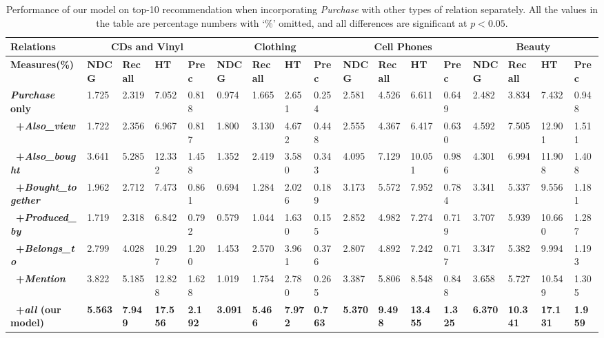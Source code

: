 \documentclass[algorithms,article,accept,moreauthors,pdftex,10pt,a4paper]{Definitions/mdpi}
\begin{document}
\begin{table}[H]
\caption{Performance of our model on top-10 recommendation when incorporating \textit{Purchase} with other types of relation separately. 
		All the values in the table are percentage numbers with `\%' omitted, and all differences are significant at $p <0.05$. 
	}
	\hspace{-1cm}
	\setlength{\tabcolsep}{1pt}
	\begin{tabular}
		{lllllllllllllllll} \toprule
		\bf{Relations} &  \multicolumn{4}{c}{\bf{CDs and Vinyl}} & \multicolumn{4}{c}{\bf{Clothing}} & \multicolumn{4}{c}{\bf{Cell Phones}} & \multicolumn{4}{c}{\bf{Beauty}}\\\hline
		\bf{Measures}(\%) & \bf{NDCG} & \bf{Recall} & \bf{HT} & \bf{Prec} & \bf{NDCG} & \bf{Recall} & \bf{HT} & \bf{Prec} & \bf{NDCG} & \bf{Recall} & \bf{HT} & \bf{Prec} & \bf{NDCG} & \bf{Recall} & \bf{HT} & \bf{Prec} \\\hline
		\bf{\textit{Purchase} only} & 1.725&	2.319&	7.052&	0.818&	0.974&	1.665&	2.651&	0.254&	2.581&	4.526&	6.611&	0.649&	2.482&	3.834&	7.432&	0.948 \\\hline
		\bf{~+\textit{Also\_view}} & 1.722&	2.356&	6.967&	0.817&	1.800&	3.130&	4.672&	0.448&	2.555&	4.367&	6.417&	0.630&	4.592&	7.505&	12.901&	1.511\\
		\bf{~+\textit{Also\_bought}} & 3.641&	5.285&	12.332&	1.458&	1.352&	2.419&	3.580&	0.343&	4.095&	7.129&	10.051&	0.986&	4.301&	6.994&	11.908&	1.408\\
		\bf{~+\textit{Bought\_together}} & 1.962&	2.712&	7.473&	0.861&	0.694&	1.284&	2.026&	0.189&	3.173&	5.572&	7.952&	0.784&	3.341&	5.337&	9.556&	1.181\\
		\bf{~+\textit{Produced\_by}} & 1.719&	2.318&	6.842&	0.792&	0.579&	1.044&	1.630&	0.155&	2.852&	4.982&	7.274&	0.719&	3.707&	5.939&	10.660&	1.287\\
		\bf{~+\textit{Belongs\_to}} & 2.799&	4.028&	10.297&	1.200&	1.453&	2.570&	3.961&	0.376&	2.807&	4.892&	7.242&	0.717&	3.347&	5.382&	9.994&	1.193\\
		\bf{~+\textit{Mention}} & 3.822&	5.185&	12.828&	1.628&	1.019&	1.754&	2.780&	0.265&	3.387&	5.806&	8.548&	0.848&	3.658&	5.727&	10.549&	1.305\\ \hline
		\bf{~+\textit{all}} (our model) & \textbf{5.563} & \textbf{7.949} & \textbf{17.556} & \textbf{2.192} & \textbf{3.091} & \textbf{5.466} & \textbf{7.972} & \textbf{0.763} & \textbf{5.370} & \textbf{9.498} & \textbf{13.455} & \textbf{1.325} & \textbf{6.370} & \textbf{10.341} & \textbf{17.131} & \textbf{1.959}\\
\bottomrule
	\end{tabular}\label{tab:info-result}
\end{table}
\end{document}
